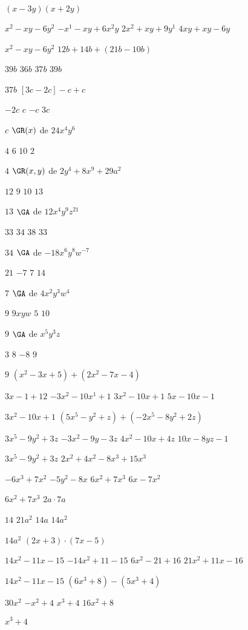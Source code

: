 $(x-3y)(x+2y)$
\begin{enum}
	\ii $x^2-xy-6y^2$
	\ii $-x^1-xy+6x^2y$
	\ii $2x^2+xy+9y^1$
	\ii $4xy+xy-6y$
\end{enum}
$x^2-xy-6y^2$
$12b+14b+(21b-10b)$
\begin{enum}
	\ii $39b$
	\ii $36b$
	\ii $37b$
	\ii $39b$
\end{enum}
$37b$
$[3c-2c]-c+c$
\begin{enum}
	\ii $-2c$
	\ii $c$
	\ii $-c$
	\ii $3c$
\end{enum}
$c$
$\GR(x)$ de $24x^4y^6$
\begin{enum}
	\ii $4$
	\ii $6$
	\ii $10$
	\ii $2$
\end{enum}
$4$
$\GR(x,y)$ de $2y^4+8x^9+29a^2$
\begin{enum}
	\ii $12$
	\ii $9$
	\ii $10$
	\ii $13$
\end{enum}
$13$
$\GA$ de $12x^4y^9z^{21}$
\begin{enum}
	\ii $33$
	\ii $34$
	\ii $38$
	\ii $33$
\end{enum}
$34$
$\GA$ de $-18x^6y^8w^{-7}$
\begin{enum}
	\ii $21$
	\ii $-7$
	\ii $7$
	\ii $14$
\end{enum}
$7$
$\GA$ de $4x^2y^3w^4$
\begin{enum}
	\ii $9$
	\ii $9xyw$
	\ii $5$
	\ii $10$
\end{enum}
$9$
$\GA$ de $x^5y^3z$
\begin{enum}
	\ii $3$
	\ii $8$
	\ii $-8$
	\ii $9$
\end{enum}
$9$
$\left(x^2-3x+5\right)+\left(2x^2-7x-4\right)$
\begin{enum}
	\ii $3x-1+12$
	\ii $-3x^2-10x^1+1$
	\ii $3x^2-10x+1$
	\ii $5x-10x-1$
\end{enum}
$3x^2-10x+1$
$\left(5x^5-y^2+z\right)+\left(-2x^5-8y^2+2z\right)$
\begin{enum}
	\ii $3x^5-9y^2+3z$
	\ii $-3x^2-9y-3z$
	\ii $4x^2-10x+4z$
	\ii $10x-8yz-1$
\end{enum}
$3x^5-9y^2+3z$
$2x^2+4x^2-8x^3+15x^3$
\begin{enum}
	\ii $-6x^3+7x^2$
	\ii $-5y^2-8x$
	\ii $6x^2+7x^3$
	\ii $6x-7x^2$
\end{enum}
$6x^2+7x^3$
$2a\cdot 7a$
\begin{enum}
	\ii $14$
	\ii $21a^2$
	\ii $14a$
	\ii $14a^2$
\end{enum}
$14a^2$
$(2x+3)\cdot(7x-5)$
\begin{enum}
	\ii $14x^2-11x-15$
	\ii $-14x^2+11-15$
	\ii $6x^2-21+16$
	\ii $21x^2+11x-16$
\end{enum}
$14x^2-11x-15$
$\left(6x^3+8\right)-\left(5x^3+4\right)$
\begin{enum}
	\ii $30x^2$
	\ii $-x^2+4$
	\ii $x^3+4$
	\ii $16x^2+8$
\end{enum}
$x^3+4$
